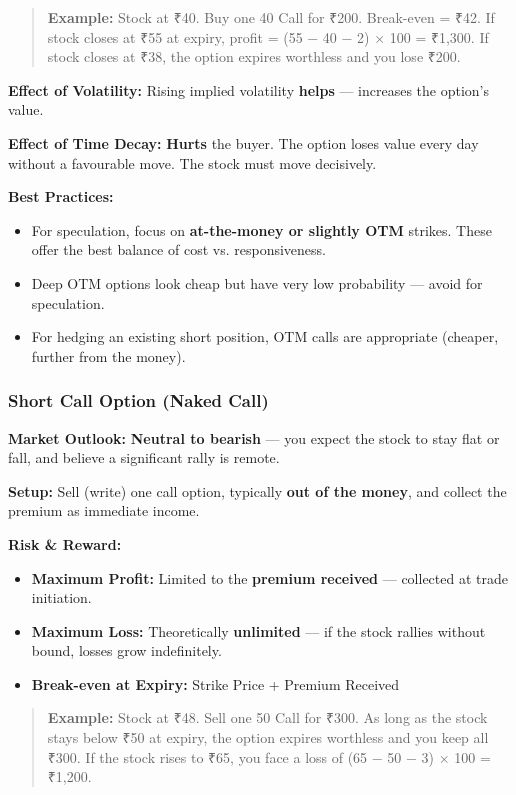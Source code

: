 \documentclass[12pt,openany]{book}
\begin{document}
\begin{quote}
\textbf{Example:} Stock at ₹40. Buy one 40 Call for ₹200. Break-even = ₹42. If stock closes at ₹55 at expiry, profit = (55 − 40 − 2) × 100 = ₹1,300. If stock closes at ₹38, the option expires worthless and you lose ₹200.
\end{quote}

\textbf{Effect of Volatility:} Rising implied volatility \textbf{helps} — increases the option's value.

\textbf{Effect of Time Decay:} \textbf{Hurts} the buyer. The option loses value every day without a favourable move. The stock must move decisively.

\textbf{Best Practices:}
\begin{itemize}[leftmargin=*]
    \item For speculation, focus on \textbf{at-the-money or slightly OTM} strikes. These offer the best balance of cost vs. responsiveness.
    \item Deep OTM options look cheap but have very low probability — avoid for speculation.
    \item For hedging an existing short position, OTM calls are appropriate (cheaper, further from the money).
\end{itemize}


\subsubsection{Short Call Option (Naked Call)}

\textbf{Market Outlook:} \textbf{Neutral to bearish} — you expect the stock to stay flat or fall, and believe a significant rally is remote.

\textbf{Setup:} Sell (write) one call option, typically \textbf{out of the money}, and collect the premium as immediate income.

\textbf{Risk \& Reward:}
\begin{itemize}[leftmargin=*]
    \item \textbf{Maximum Profit:} Limited to the \textbf{premium received} — collected at trade initiation.
    \item \textbf{Maximum Loss:} Theoretically \textbf{unlimited} — if the stock rallies without bound, losses grow indefinitely.
    \item \textbf{Break-even at Expiry:} Strike Price + Premium Received
\end{itemize}

\begin{quote}
\textbf{Example:} Stock at ₹48. Sell one 50 Call for ₹300. As long as the stock stays below ₹50 at expiry, the option expires worthless and you keep all ₹300. If the stock rises to ₹65, you face a loss of (65 − 50 − 3) × 100 = ₹1,200.
\end{quote}
\end{document}
